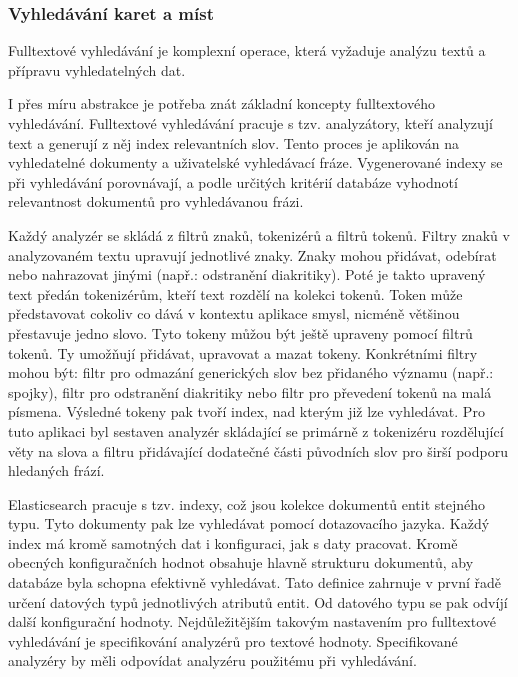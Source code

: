 		\subsubsection{Vyhledávání karet a míst}

		Fulltextové vyhledávání je komplexní operace, která vyžaduje analýzu textů a přípravu vyhledatelných dat.

		I přes míru abstrakce je potřeba znát základní koncepty fulltextového vyhledávání.
		Fulltextové vyhledávání pracuje s tzv. analyzátory, kteří analyzují text a generují z něj index relevantních
		slov.
		Tento proces je aplikován na vyhledatelné dokumenty a uživatelské vyhledávací fráze.
		Vygenerované indexy se při vyhledávání porovnávají, a podle určitých kritérií databáze vyhodnotí relevantnost
		dokumentů pro vyhledávanou frázi. \cite{index_search_analysis}

		Každý analyzér se skládá z filtrů znaků, tokenizérů a filtrů tokenů.
		Filtry znaků v analyzovaném textu upravují jednotlivé znaky.
		Znaky mohou přidávat, odebírat nebo nahrazovat jinými (např.: odstranění diakritiky).
		Poté je takto upravený text předán tokenizérům, kteří text rozdělí na kolekci tokenů.
		Token může představovat cokoliv co dává v kontextu aplikace smysl, nicméně většinou přestavuje jedno
		slovo.
		Tyto tokeny můžou být ještě upraveny pomocí filtrů tokenů.
		Ty umožňují přidávat, upravovat a mazat tokeny.
		Konkrétními filtry mohou být: filtr pro odmazání generických slov bez přidaného významu (např.: spojky), filtr pro odstranění
		diakritiky nebo filtr pro převedení tokenů na malá písmena.
		Výsledné tokeny pak tvoří index, nad kterým již lze vyhledávat.
		\cite{analyzer_anatomy}
		Pro tuto aplikaci byl sestaven analyzér skládající se primárně z tokenizéru rozdělující věty na slova a filtru
		přidávající dodatečné části původních slov pro širší podporu hledaných frází.

		Elasticsearch pracuje s tzv. indexy, což jsou kolekce dokumentů entit stejného typu.
		Tyto dokumenty pak lze vyhledávat pomocí dotazovacího jazyka.
		Každý index má kromě samotných dat i konfiguraci, jak s daty pracovat.
		Kromě obecných konfiguračních hodnot obsahuje hlavně strukturu dokumentů, aby databáze byla schopna efektivně vyhledávat.
		Tato definice zahrnuje v první řadě určení datových typů jednotlivých atributů entit.
		Od datového typu se pak odvíjí další konfigurační hodnoty.
		Nejdůležitějším takovým nastavením pro fulltextové vyhledávání je specifikování analyzérů pro textové hodnoty.
		Specifikované analyzéry by měli odpovídat analyzéru použitému při vyhledávání.

